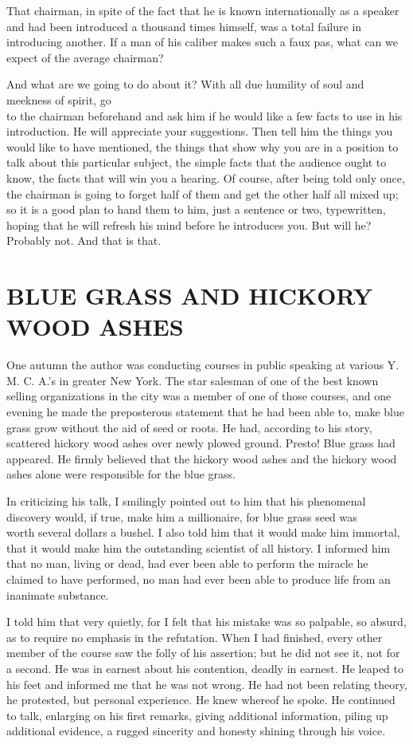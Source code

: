 \documentclass[10pt]{article}
\begin{document}
That chairman, in spite of the fact that he is known internationally as a speaker and had been introduced a thousand times himself, was a total failure in introducing another. If a man of his caliber makes such a faux pas, what can we expect of the average chairman?

And what are we going to do about it? With all due humility of soul and meekness of spirit, go\\
to the chairman beforehand and ask him if he would like a few facts to use in his introduction. He will appreciate your suggestions. Then tell him the things you would like to have mentioned, the things that show why you are in a position to talk about this particular subject, the simple facts that the audience ought to know, the facts that will win you a hearing. Of course, after being told only once, the chairman is going to forget half of them and get the other half all mixed up; so it is a good plan to hand them to him, just a sentence or two, typewritten, hoping that he will refresh his mind before he introduces you. But will he? Probably not. And that is that.

\section*{BLUE GRASS AND HICKORY WOOD ASHES}
One autumn the author was conducting courses in public speaking at various Y. M. C. A.'s in greater New York. The star salesman of one of the best known selling organizations in the city was a member of one of those courses, and one evening he made the preposterous statement that he had been able to, make blue grass grow without the aid of seed or roots. He had, according to his story, scattered hickory wood ashes over newly plowed ground. Presto! Blue grass had appeared. He firmly believed that the hickory wood ashes and the hickory wood ashes alone were responsible for the blue grass.

In criticizing his talk, I smilingly pointed out to him that his phenomenal discovery would, if true, make him a millionaire, for blue grass seed was\\
worth several dollars a bushel. I also told him that it would make him immortal, that it would make him the outstanding scientist of all history. I informed him that no man, living or dead, had ever been able to perform the miracle he claimed to have performed, no man had ever been able to produce life from an inanimate substance.

I told him that very quietly, for I felt that his mistake was so palpable, so absurd, as to require no emphasis in the refutation. When I had finished, every other member of the course saw the folly of his assertion; but he did not see it, not for a second. He was in earnest about his contention, deadly in earnest. He leaped to his feet and informed me that he was not wrong. He had not been relating theory, he protested, but personal experience. He knew whereof he spoke. He continued to talk, enlarging on his first remarks, giving additional information, piling up additional evidence, a rugged sincerity and honesty shining through his voice.
\end{document}
